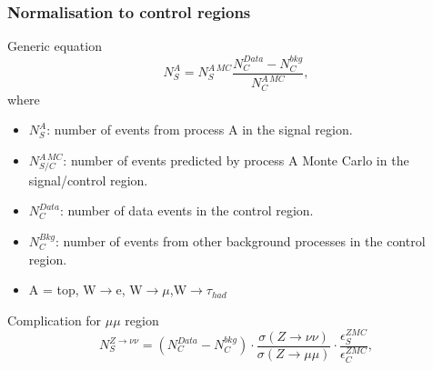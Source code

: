 \documentclass[red,compress,xcolor=table]{beamer}
\begin{document}
\begin{frame}
\frametitle{Normalisation to control regions}


\begin{block}{\scriptsize Generic equation}
\begin{equation}
  N_{S}^{A}=N_{S}^{A\,MC}\frac{N_{C}^{Data}-N_{C}^{bkg}}{N_{C}^{A\,MC}},
\end{equation}
where
\begin{itemize}
\item \scriptsize $N_{S}^{A}$: number of events from process A in the signal region.
\item \scriptsize $N_{S/C}^{A\,MC}$: number of events predicted by process A Monte Carlo in the signal/control region.
\item \scriptsize $N_{C}^{Data}$: number of data events in the control region.
\item \scriptsize $N_{C}^{Bkg}$: number of events from other background processes in the control region.
\item \scriptsize A = top, W$\rightarrow$e, W$\rightarrow\mu$,W$\rightarrow\tau_{had}$ 
\end{itemize}
\end{block}

\begin{block}{\scriptsize Complication for $\mu\mu$ region}
\begin{equation}
  N_{S}^{Z\rightarrow\nu\nu}=\left(N_{C}^{Data}-N_{C}^{bkg}\right) \cdot\frac{\sigma\left(Z\rightarrow\nu\nu\right)}{\sigma\left(Z\rightarrow\mu\mu\right)}\cdot \frac{\epsilon_{S}^{ZMC}}{\epsilon_{C}^{ZMC}},
\end{equation}
\end{block}

\end{frame}
\end{document}
